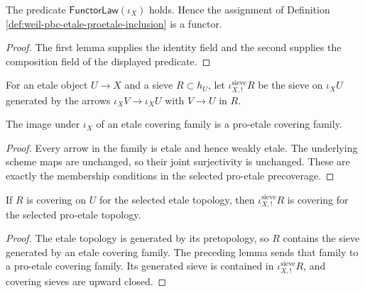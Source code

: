 \begin{proposition}
\label{prop:weil-efi-site-inclusion-functor}
The predicate $\mathsf{FunctorLaw}(\iota_X)$ holds.  Hence the assignment of
Definition \ref{def:weil-pbc-etale-proetale-inclusion} is a functor.
\end{proposition}
\begin{proof}
The first lemma supplies the identity field and the second supplies the
composition field of the displayed predicate.
\end{proof}

\begin{definition}
\label{def:weil-efi-site-covering-sieve-image}
For an etale object $U\to X$ and a sieve $R\subset h_U$, let
$\iota_{X,!}^{\mathrm{sieve}}R$ be the sieve on $\iota_XU$ generated by the
arrows $\iota_XV\to\iota_XU$ with $V\to U$ in $R$.
\end{definition}

\begin{lemma}
\label{lemma:weil-efi-site-covering-family-image}
The image under $\iota_X$ of an etale covering family is a pro-etale
covering family.
\end{lemma}
\begin{proof}
Every arrow in the family is etale and hence weakly etale.  The underlying
scheme maps are unchanged, so their joint surjectivity is unchanged.  These
are exactly the membership conditions in the selected pro-etale
precoverage.
\end{proof}

\begin{lemma}
\label{lemma:weil-efi-site-covering-sieve-image}
If $R$ is covering on $U$ for the selected etale topology, then
$\iota_{X,!}^{\mathrm{sieve}}R$ is covering for the selected pro-etale
topology.
\end{lemma}
\begin{proof}
The etale topology is generated by its pretopology, so $R$ contains the sieve
generated by an etale covering family.  The preceding lemma sends that family
to a pro-etale covering family.  Its generated sieve is contained in
$\iota_{X,!}^{\mathrm{sieve}}R$, and covering sieves are upward closed.
\end{proof}

